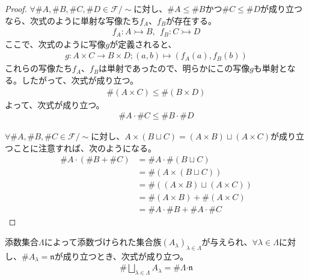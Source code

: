 \documentclass[dvipdfmx]{jsarticle}
\begin{document}
\begin{proof}
$\forall\# A,\# B,\# C,\# D \in \mathcal{F} /\sim $に対し、$\# A \leq \# B$かつ$\# C \leq \# D$が成り立つなら、次式のように単射な写像たち$f_{A}$、$f_{B}$が存在する。
\begin{align*}
f_{A}:A \rightarrowtail B,\ \ f_{B}:C \rightarrowtail D
\end{align*}
ここで、次式のように写像$g$が定義されると、
\begin{align*}
g:A \times C \rightarrow B \times D;(a,b) \mapsto \left( f_{A}(a),f_{B}(b) \right)
\end{align*}
これらの写像たち$f_{A}$、$f_{B}$は単射であったので、明らかにこの写像$g$も単射となる。したがって、次式が成り立つ。
\begin{align*}
\# (A \times C) \leq \# (B \times D)
\end{align*}
よって、次式が成り立つ。
\begin{align*}
\# A \cdot \# C \leq \# B \cdot \# D
\end{align*}\par
$\forall\# A,\# B,\# C \in \mathcal{F} /\sim $に対し、$A \times (B \sqcup C) = (A \times B) \sqcup (A \times C)$が成り立つことに注意すれば、次のようになる。
\begin{align*}
\# A \cdot \left( \# B + \# C \right) &= \# A \cdot \# (B \sqcup C)\\
&= \# \left( A \times (B \sqcup C) \right)\\
&= \# \left( (A \times B) \sqcup (A \times C) \right)\\
&= \# (A \times B) + \# (A \times C)\\
&= \# A \cdot \# B + \# A \cdot \# C
\end{align*}
\end{proof}
\begin{thm}\label{1.2.8.6}
添数集合$\varLambda$によって添数づけられた集合族$\left( A_{\lambda} \right)_{\lambda \in \varLambda}$が与えられ、$\forall\lambda \in \varLambda$に対し、$\# A_{\lambda} = \mathfrak{n}$が成り立つとき、次式が成り立つ。
\begin{align*}
\# {\bigsqcup_{\lambda \in \varLambda} A_{\lambda}} = \# \varLambda\mathfrak{\cdot n}
\end{align*}
\end{thm}
\end{document}
